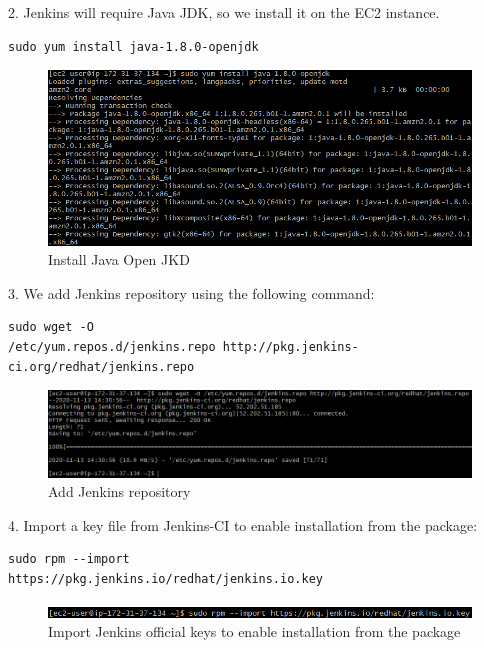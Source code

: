 \documentclass[12pt,a4paper,twoside]{article}
\begin{document}
2. Jenkins will require Java JDK, so we install it on the EC2 instance.


\begin{verbatim}
sudo yum install java-1.8.0-openjdk
\end{verbatim}


\begin{figure}[H]
    \centering
        \includegraphics[width=15cm]{images-aws/15-install-java.png}
        \caption{Install Java Open JKD}
\end{figure}


3. We add Jenkins repository using the following command:


\begin{verbatim}
sudo wget -O
/etc/yum.repos.d/jenkins.repo http://pkg.jenkins-
ci.org/redhat/jenkins.repo
\end{verbatim}


\begin{figure}[H]
    \centering
        \includegraphics[width=15cm]{images-aws/16-download-jenkins.png}
        \caption{Add Jenkins repository}
\end{figure}


4. Import a key file from Jenkins-CI to enable installation from the package:


\begin{verbatim}
sudo rpm --import
https://pkg.jenkins.io/redhat/jenkins.io.key
\end{verbatim}


\begin{figure}[H]
    \centering
        \includegraphics[width=15cm]{images-aws/17-import-jenkins-keys.png}
        \caption{Import Jenkins official keys to enable installation from the package}
\end{figure}
\end{document}
